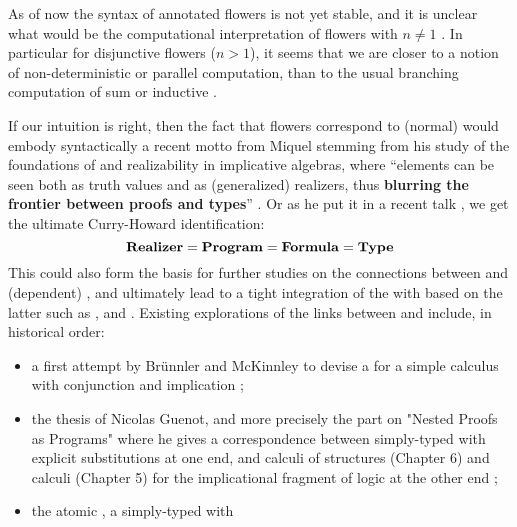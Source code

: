 \begin{scope}
As of now the syntax of annotated flowers is not yet stable, and it is unclear
what would be the computational interpretation of flowers with $n \not= 1$
. In particular for disjunctive flowers ($n > 1$), it seems that we are
closer to a notion of non-deterministic or parallel computation, than to the
usual branching computation of sum or inductive .

If our intuition is right, then the fact that flowers correspond to (normal)
 would embody syntactically a recent motto from Miquel stemming
from his study of the foundations of  and realizability in
implicative
algebras, where ``elements can be seen both as truth values and as (generalized)
realizers, thus \textbf{blurring the frontier between proofs and
types}'' . Or as he put it in a
recent talk \cite{miquel_implicative_topos_2022}, we get the ultimate
Curry-Howard identification:
$$
\text{\textbf{Realizer}} = \text{\textbf{Program}} = \text{\textbf{Formula}} = \text{\textbf{Type}}
$$
This could also form the basis for further studies on the connections between
 and (dependent) , and ultimately lead to a tight
integration of the  with  based on the
latter such as ,  and . Existing explorations of the
links between  and  include, in historical
order:
\begin{itemize}
  \item a first attempt by Brünnler and McKinnley to devise a  for a simple   calculus with
  conjunction and implication ;
  \item the thesis of Nicolas Guenot, and more precisely the part on "Nested
  Proofs as Programs" where he gives a correspondence between simply-typed
   with explicit substitutions at one end, and calculi of
  structures (Chapter 6) and  calculi (Chapter 5) for the
  implicational fragment of  logic at the other end
  \cite{guenot_nested_2013};
  \item the atomic , a simply-typed  with

\end{itemize}
\end{scope}
